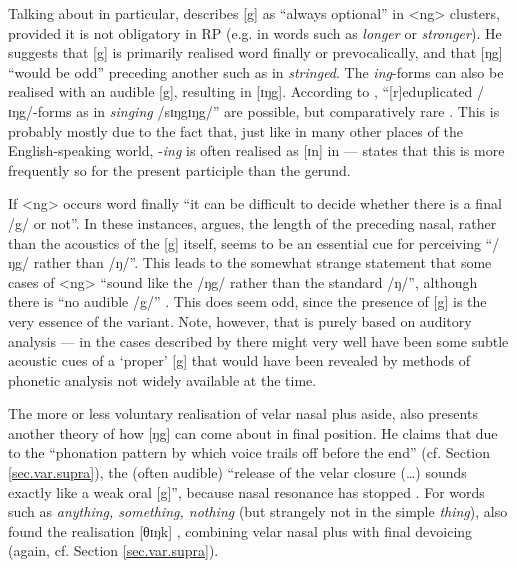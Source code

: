 Talking about  in particular, \textcite[293]{knowles1973} describes [g] as ``always optional'' in <ng> clusters, provided it is not obligatory in RP (e.g. in words such as \emph{longer} or \emph{stronger}).
He suggests that [g] is primarily realised word finally or prevocalically, and that [ŋg] ``would be odd'' \parencite[293]{knowles1973} preceding another  such as in \emph{stringed}.
The \emph{ing}-forms can also be realised with an audible [g], resulting in [ɪŋg].
According to \textcite[293]{knowles1973}, ``[r]eduplicated /ɪŋg/-forms as in \emph{singing} /sɪŋgɪŋg/'' are possible, but comparatively rare \citep[cf.][293]{knowles1973}.
This is probably mostly due to the fact that, just like in many other places of the English-speaking world, -\emph{ing} is often realised as [ɪn] in  --- \textcite[cf.][156]{knowles1973} states that this is more frequently so for the present participle than the gerund.

If <ng> occurs word finally ``it can be difficult to decide whether there is a final /g/ or not''.
In these instances, \citeauthor{knowles1973} argues, the length of the preceding nasal, rather than the acoustics of the [g] itself, seems to be an essential cue for perceiving ``/ŋg/ rather than /ŋ/''.
This leads \citeauthor{knowles1973} to the somewhat strange statement that some cases of <ng> ``sound like the  /ŋg/ rather than the standard /ŋ/'', although there is ``no audible /g/'' \citep[293]{knowles1973}.
This does seem odd, since the presence of [g] is the very essence of the  variant.
Note, however, that \citealt{knowles1973} is purely based on auditory analysis --- in the cases described by \citeauthor{knowles1973} there might very well have been some subtle acoustic cues of a `proper' [g] that would have been revealed by methods of phonetic analysis not widely available at the time.

The more or less voluntary realisation of velar nasal plus aside, \cite{knowles1973} also presents another theory of how [ŋg] can come about in final position.
He claims that due to the ``phonation pattern by which voice trails off before the end'' (cf. Section \ref{sec.var.supra}), the (often audible) ``release of the velar closure (\ldots) sounds exactly like a weak oral [g]'', because nasal resonance has stopped \citep[cf.][294]{knowles1973}.
For words such as \emph{anything, something, nothing} (but strangely not in the simple \emph{thing}), \textcite[cf.][156]{knowles1973} also found the realisation [θɪŋk] , combining velar nasal plus with final devoicing (again, cf. Section \ref{sec.var.supra}).

